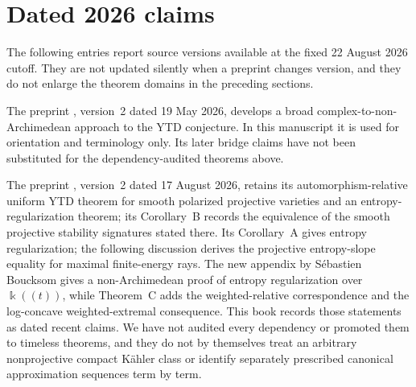 \section{Dated 2026 claims}
\label{sec:ytd-recent-claims}

The following entries report source versions available at the fixed
22 August 2026 cutoff. They are not updated silently when a preprint changes
version, and they do not enlarge the theorem domains in the preceding
sections.

\begin{remark}
\label{rem:ytd-bj26}
The preprint \cite{BJ26ComplexNA}, version~2 dated 19 May 2026,
develops a broad complex-to-non-Archimedean approach to the YTD
conjecture. In this manuscript it is used for orientation and
terminology only. Its later bridge claims have not been substituted
for the dependency-audited theorems above.
\end{remark}

\begin{remark}
\label{rem:ytd-trusiani26}
The preprint \cite{Trusiani26}, version~2 dated 17 August 2026, retains its
automorphism-relative uniform YTD theorem for smooth polarized
projective varieties and an entropy-regularization theorem; its
Corollary~B records the equivalence of the smooth projective stability
signatures stated there. Its Corollary~A gives entropy regularization;
the following discussion derives the projective entropy-slope equality
for maximal finite-energy rays. The new
appendix by S\'ebastien Boucksom gives a non-Archimedean proof of entropy
regularization over $\Bbbk((t))$, while Theorem~C adds the
weighted-relative correspondence and the log-concave weighted-extremal
consequence.  This book records those statements as dated recent claims. We
have not audited every dependency or promoted them to timeless theorems, and
they do not by themselves treat an arbitrary nonprojective compact K\"ahler
class or identify separately prescribed canonical approximation sequences
term by term.
\end{remark}

